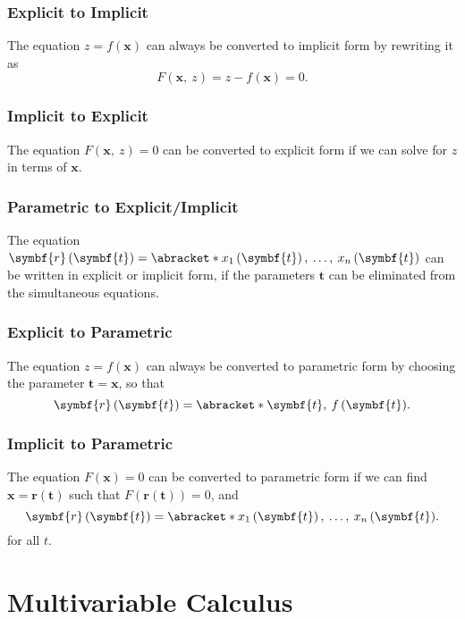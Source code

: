 \documentclass{article}
\begin{document}
\subsubsection{Explicit to Implicit}
The equation \(z = f\left( \symbf{x} \right)\) can always be converted
to implicit form by rewriting it as
\begin{equation*}
    F\left( \symbf{x},\: z \right) = z - f\left( \symbf{x} \right) = 0.
\end{equation*}
\subsubsection{Implicit to Explicit}
The equation \(F\left( \symbf{x},\: z \right) = 0\) can be converted to
explicit form if we can solve for \(z\) in terms of \(\symbf{x}\).
\subsubsection{Parametric to Explicit/Implicit}
The equation \(\symbf{r}\left( \symbf{t} \right) = \abracket*{x_1\left(
\symbf{t} \right),\: \dots,\: x_n\left( \symbf{t} \right)}\) can be
written in explicit or implicit form, if the parameters \(\symbf{t}\)
can be eliminated from the simultaneous equations.
\subsubsection{Explicit to Parametric}
The equation \(z = f\left( \symbf{x} \right)\) can always be converted
to parametric form by choosing the parameter \(\symbf{t} = \symbf{x}\),
so that
\begin{equation*}
    \symbf{r}\left( \symbf{t} \right) = \abracket*{\symbf{t},\: f\left( \symbf{t} \right)}.
\end{equation*}
\subsubsection{Implicit to Parametric}
The equation \(F\left( \symbf{x} \right) = 0\) can be converted to
parametric form if we can find \(\symbf{x} = \symbf{r}\left( \symbf{t}
\right)\) such that \(F\left( \symbf{r}\left( \symbf{t} \right) \right)
= 0\), and
\begin{equation*}
    \symbf{r}\left( \symbf{t} \right) = \abracket*{x_1\left( \symbf{t} \right),\: \dots,\: x_n\left( \symbf{t} \right)}.
\end{equation*}
for all \(t\).
\section{Multivariable Calculus}
\end{document}
